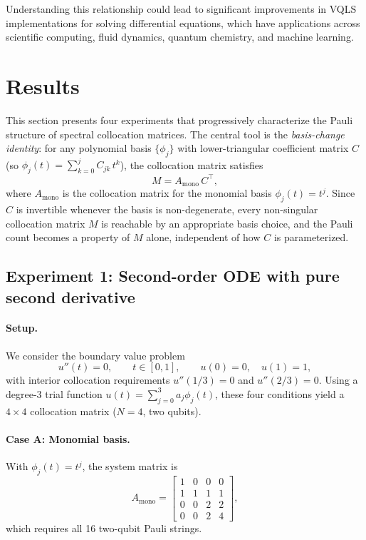 \documentclass[a4paper,12pt]{amsart}
\begin{document}
Understanding this relationship could lead to significant improvements in VQLS implementations for solving differential equations, which have applications across scientific computing, fluid dynamics, quantum chemistry, and machine learning.

\section{Results}

This section presents four experiments that progressively characterize the Pauli structure of spectral collocation matrices. The central tool is the \emph{basis-change identity}: for any polynomial basis $\{\phi_j\}$ with lower-triangular coefficient matrix $C$ (so $\phi_j(t) = \sum_{k=0}^{j} C_{jk}\,t^k$), the collocation matrix satisfies
\begin{equation}
    M = A_{\mathrm{mono}}\,C^{\top},
\end{equation}
where $A_{\mathrm{mono}}$ is the collocation matrix for the monomial basis $\phi_j(t)=t^j$. Since $C$ is invertible whenever the basis is non-degenerate, every non-singular collocation matrix $M$ is reachable by an appropriate basis choice, and the Pauli count becomes a property of $M$ alone, independent of how $C$ is parameterized.

\subsection{Experiment 1: Second-order ODE with pure second derivative}

\paragraph{Setup.}
We consider the boundary value problem
\begin{equation}
    u''(t) = 0, \qquad t \in [0,1], \qquad u(0) = 0,\quad u(1) = 1,
\end{equation}
with interior collocation requirements $u''(1/3) = 0$ and $u''(2/3) = 0$. Using a degree-3 trial function $u(t) = \sum_{j=0}^{3} a_j\phi_j(t)$, these four conditions yield a $4 \times 4$ collocation matrix ($N=4$, two qubits).

\paragraph{Case A: Monomial basis.}
With $\phi_j(t) = t^j$, the system matrix is
\begin{equation}
A_{\mathrm{mono}} =
\begin{bmatrix}
1 & 0 & 0 & 0 \\
1 & 1 & 1 & 1 \\
0 & 0 & 2 & 2 \\
0 & 0 & 2 & 4
\end{bmatrix},
\end{equation}
which requires all 16 two-qubit Pauli strings.
\end{document}
